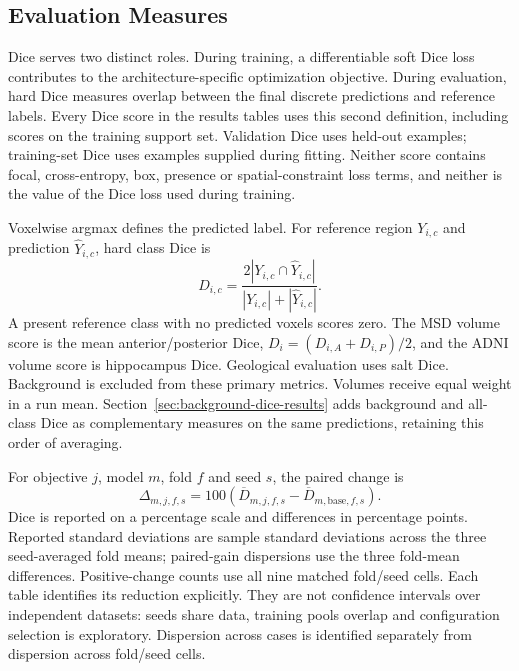 \documentclass[12pt,a4paper]{article}
\begin{document}
\subsection{Evaluation Measures}
\label{sec:evaluation-methods}

Dice serves two distinct roles. During training, a differentiable soft
Dice loss contributes to the architecture-specific optimization
objective. During evaluation, hard Dice measures overlap between the
final discrete predictions and reference labels. Every Dice score in
the results tables uses this second definition, including scores on the
training support set. Validation Dice uses held-out examples;
training-set Dice uses examples supplied during fitting. Neither score
contains focal, cross-entropy, box, presence or spatial-constraint loss
terms, and neither is the value of the Dice loss used during training.

Voxelwise argmax defines the predicted label. For reference region
$Y_{i,c}$ and prediction $\widehat Y_{i,c}$, hard class Dice is
\begin{equation}
 D_{i,c}=\frac{2|Y_{i,c}\cap\widehat Y_{i,c}|}
 {|Y_{i,c}|+|\widehat Y_{i,c}|}.
\label{eq:reported-hard-dice}
\end{equation}
A present reference class with no predicted voxels scores zero.
The MSD volume score is the mean anterior/posterior Dice,
$D_i=(D_{i,A}+D_{i,P})/2$, and the ADNI volume score is hippocampus Dice. Geological evaluation
uses salt Dice.
Background is excluded from these primary metrics. Volumes receive
equal weight in a run mean. Section~\ref{sec:background-dice-results}
adds background and all-class Dice as complementary measures on
the same predictions, retaining this order of averaging.

For objective $j$, model $m$, fold $f$ and seed $s$, the paired change is
\begin{equation}
 \Delta_{m,j,f,s}=100\left(
 \overline D_{m,j,f,s}-\overline D_{m,\mathrm{base},f,s}\right).
\label{eq:paired-reported-gain}
\end{equation}
Dice is reported on a percentage scale and differences in percentage
points. Reported standard deviations are sample standard deviations across
the three seed-averaged fold means; paired-gain dispersions use the three
fold-mean differences. Positive-change counts use all nine matched
fold/seed cells. Each table identifies its reduction explicitly. They are not
confidence intervals over independent datasets: seeds share data,
training pools overlap and configuration selection is exploratory.
Dispersion across cases is identified separately from dispersion
across fold/seed cells.
\end{document}
